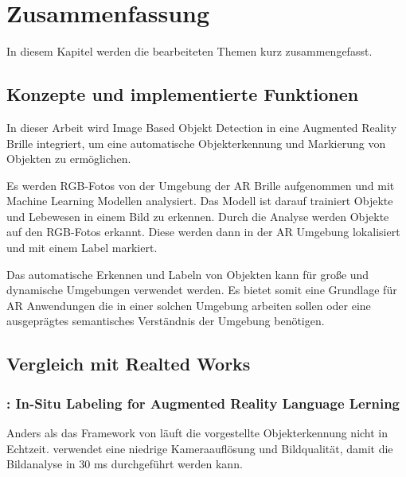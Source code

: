 \section{Zusammenfassung}

In diesem Kapitel werden die bearbeiteten Themen kurz zusammengefasst.

\subsection{Konzepte und implementierte Funktionen}

In dieser Arbeit wird Image Based Objekt Detection in eine Augmented Reality Brille integriert, um eine automatische Objekterkennung und Markierung von Objekten zu ermöglichen.

Es werden RGB-Fotos von der Umgebung der AR Brille aufgenommen und mit Machine Learning Modellen analysiert.
Das Modell ist darauf trainiert Objekte und Lebewesen in einem Bild zu erkennen. Durch die Analyse werden Objekte auf den RGB-Fotos erkannt. Diese werden dann in der AR Umgebung lokalisiert und mit einem Label markiert.

Das automatische Erkennen und Labeln von Objekten kann für große und dynamische Umgebungen verwendet werden. Es bietet somit eine Grundlage für AR Anwendungen die in einer solchen Umgebung arbeiten sollen oder eine ausgeprägtes semantisches Verständnis der Umgebung benötigen. %



\subsection{Vergleich mit Realted Works}
\subsubsection*{\cite{LabelingLanguageLearning}: In-Situ Labeling for Augmented Reality Language Lerning}
Anders als das Framework von \cite{LabelingLanguageLearning} läuft die vorgestellte Objekterkennung nicht in Echtzeit. \cite{LabelingLanguageLearning} verwendet eine niedrige Kameraauflösung und Bildqualität, damit die Bildanalyse in 30 ms durchgeführt werden kann.

